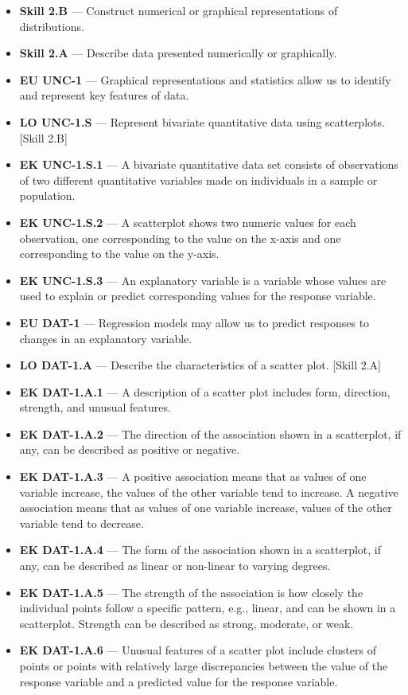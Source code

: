 \documentclass[11pt]{article}
\begin{document}


{\small
\begin{itemize}[leftmargin=1.5em,itemsep=2pt,topsep=2pt]
  \item \textbf{Skill 2.B} --- Construct numerical or graphical representations of distributions.
  \item \textbf{Skill 2.A} --- Describe data presented numerically or graphically.
  \item \textbf{EU UNC-1} --- Graphical representations and statistics allow us to identify and represent key features of data.
  \item \textbf{LO UNC-1.S} --- Represent bivariate quantitative data using scatterplots. [Skill 2.B]
  \item \textbf{EK UNC-1.S.1} --- A bivariate quantitative data set consists of observations of two different quantitative variables made on individuals in a sample or population.
  \item \textbf{EK UNC-1.S.2} --- A scatterplot shows two numeric values for each observation, one corresponding to the value on the x-axis and one corresponding to the value on the y-axis.
  \item \textbf{EK UNC-1.S.3} --- An explanatory variable is a variable whose values are used to explain or predict corresponding values for the response variable.
  \item \textbf{EU DAT-1} --- Regression models may allow us to predict responses to changes in an explanatory variable.
  \item \textbf{LO DAT-1.A} --- Describe the characteristics of a scatter plot. [Skill 2.A]
  \item \textbf{EK DAT-1.A.1} --- A description of a scatter plot includes form, direction, strength, and unusual features.
  \item \textbf{EK DAT-1.A.2} --- The direction of the association shown in a scatterplot, if any, can be described as positive or negative.
  \item \textbf{EK DAT-1.A.3} --- A positive association means that as values of one variable increase, the values of the other variable tend to increase. A negative association means that as values of one variable increase, values of the other variable tend to decrease.
  \item \textbf{EK DAT-1.A.4} --- The form of the association shown in a scatterplot, if any, can be described as linear or non-linear to varying degrees.
  \item \textbf{EK DAT-1.A.5} --- The strength of the association is how closely the individual points follow a specific pattern, e.g., linear, and can be shown in a scatterplot. Strength can be described as strong, moderate, or weak.
  \item \textbf{EK DAT-1.A.6} --- Unusual features of a scatter plot include clusters of points or points with relatively large discrepancies between the value of the response variable and a predicted value for the response variable.
\end{itemize}
}
\end{document}
